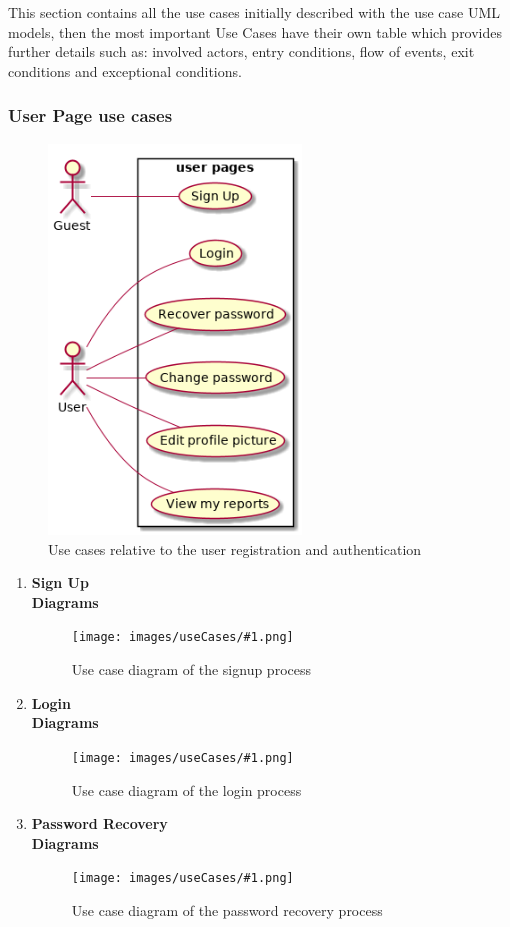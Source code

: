 \newcommand{\usecasefigure}[2]{
	\begin{figure}[htp]
		\centering
		\texttt{[image: images/useCases/\#1.png]}
		\caption{Use case diagram #2}
		\label{fig:use_cases_#1}
	\end{figure}
	\newpage
}

This section contains all the use cases initially described with the use case UML models, then the most important Use Cases have their own table which provides further details such as: involved actors, entry conditions, flow of events,  exit conditions and exceptional conditions.

\subsubsection{User Page use cases}
\begin{figure}[htp]
	\centering
	\includegraphics[width=0.6\textwidth]{images/useCases/uc_user_page.png}
	\caption{Use cases relative to the user registration and authentication} 
	\label{fig:userpage} 
\end{figure} 

\newpage
\begin{enumerate}
	\item \textbf{Sign Up}\\
		
		\newpage
		\textbf{Diagrams}
		\usecasefigure{sign_up}{of the signup process}
		\newpage
	\item \textbf{Login}\\
		
		\newpage
		\textbf{Diagrams}
		\usecasefigure{login}{of the login process}
		\newpage
	\item \textbf{Password Recovery}\\
		
		\newpage
		\textbf{Diagrams}
		\usecasefigure{password_recovery}{of the password recovery process}
		\newpage
\end{enumerate}
\newpage

